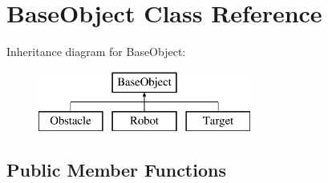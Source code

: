 \hypertarget{classBaseObject}{\section{Base\-Object Class Reference}
\label{classBaseObject}
}
Inheritance diagram for Base\-Object\-:\begin{figure}[H]
\begin{center}
\leavevmode
\includegraphics[height=2.000000cm]{classBaseObject}
\end{center}
\end{figure}
\subsection*{Public Member Functions}
